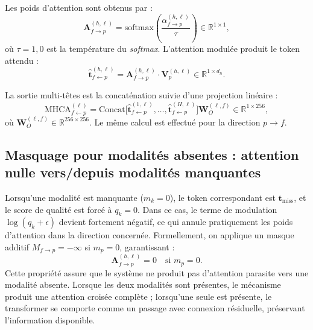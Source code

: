 \documentclass[12pt,a4paper]{report}
\begin{document}
Les poids d'attention sont obtenus par :
\begin{equation}
\mathbf{A}_{f \rightarrow p}^{(h,\ell)} = \text{softmax}\left(\frac{\alpha_{f \rightarrow p}^{(h,\ell)}}{\tau}\right) \in \mathbb{R}^{1 \times 1},
\end{equation}
o\`{u} $\tau = 1{,}0$ est la temp\'{e}rature du \emph{softmax}. L'attention modul\'{e}e produit le token attendu :
\begin{equation}
\hat{\mathbf{t}}_{f \leftarrow p}^{(h,\ell)} = \mathbf{A}_{f \rightarrow p}^{(h,\ell)} \cdot \mathbf{V}_p^{(h,\ell)} \in \mathbb{R}^{1 \times d_h}.
\end{equation}

La sortie multi-t\^{e}tes est la concat\'{e}nation suivie d'une projection lin\'{e}aire :
\begin{equation}
\text{MHCA}_{f \leftarrow p}^{(\ell)} = \text{Concat}\bigl[\hat{\mathbf{t}}_{f \leftarrow p}^{(1,\ell)}, \ldots, \hat{\mathbf{t}}_{f \leftarrow p}^{(H,\ell)}\bigr] \mathbf{W}_O^{(\ell,f)} \in \mathbb{R}^{1 \times 256},
\end{equation}
o\`{u} $\mathbf{W}_O^{(\ell,f)} \in \mathbb{R}^{256 \times 256}$. Le m\^{e}me calcul est effectu\'{e} pour la direction $p \rightarrow f$.

\subsection{Masquage pour modalit\'{e}s absentes : attention nulle vers/depuis modalit\'{e}s manquantes}

Lorsqu'une modalit\'{e} est manquante ($m_k = 0$), le token correspondant est $\mathbf{t}_{\text{miss}}$, et le score de qualit\'{e} est forc\'{e} \`{a} $q_k = 0$. Dans ce cas, le terme de modulation $\log(q_k + \epsilon)$ devient fortement n\'{e}gatif, ce qui annule pratiquement les poids d'attention dans la direction concern\'{e}e. Formellement, on applique un masque additif $M_{f \rightarrow p} = -\infty$ si $m_p = 0$, garantissant :
\begin{equation}
\mathbf{A}_{f \rightarrow p}^{(h,\ell)} = 0 \quad \text{si } m_p = 0.
\end{equation}
Cette propri\'{e}t\'{e} assure que le syst\`{e}me ne produit pas d'attention parasite vers une modalit\'{e} absente. Lorsque les deux modalit\'{e}s sont pr\'{e}sentes, le m\'{e}canisme produit une attention crois\'{e}e compl\`{e}te ; lorsqu'une seule est pr\'{e}sente, le transformer se comporte comme un passage avec connexion r\'{e}siduelle, pr\'{e}servant l'information disponible.
\end{document}
